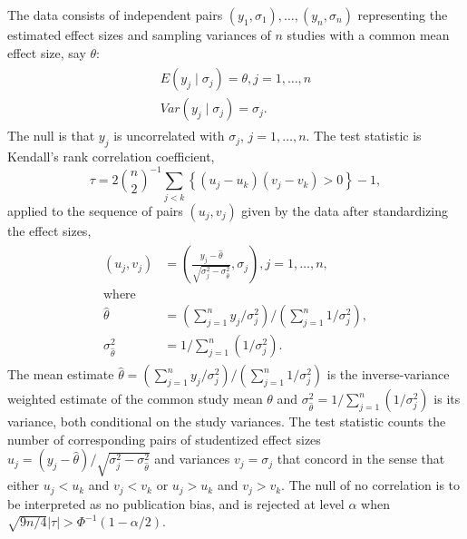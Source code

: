 \documentclass[12pt]{article}
\newcommand{\E}{E}
\newcommand{\V}{Var}
\begin{document}
    The data consists of independent pairs
    $(y_1,\sigma_1),\ldots,(y_n,\sigma_n)$ representing the estimated
    effect sizes and sampling variances of $n$ studies with a common mean effect size, say $\theta$:
    \begin{align}
      \begin{split}
      \E(y_j\mid\sigma_j)=\theta, j=1,\ldots,n\\
      \V(y_j\mid\sigma_j)=\sigma_j.
      \label{model:nonpara}
    \end{split}
    \end{align}
    The null is that $y_j$ is uncorrelated with $\sigma_j$, $j=1,\ldots,n$.
    The test statistic is Kendall's rank
    correlation coefficient,
    $$
    \tau=2{n\choose 2}^{-1}\sum_{j<k}\left\{(u_j-u_k)(v_j-v_k)>0\right\} - 1,
    $$
    applied to the sequence of pairs $(u_j,v_j)$ given by the data after standardizing the effect sizes,
    \begin{align}
      \begin{split}\label{defn:pairs}
        (u_j,v_j)&=\left(\frac{y_j-\hat{\theta}}{\sqrt{\sigma_j^2-\sigma^2_{\hat{\theta}}}},\sigma_j\right),j=1,\ldots,n,\\
        \text{where}\\
        \hat{\theta}&=(\sum_{j=1}^ny_j/\sigma^2_j)/(\sum_{j=1}^n1/\sigma_j^2),\\
        \sigma^2_{\hat{\theta}}&=1/\sum_{j=1}^n(1/\sigma_j^2).
      \end{split}
    \end{align}
    The mean estimate
    $\hat{\theta}=(\sum_{j=1}^ny_j/\sigma^2_j)/(\sum_{j=1}^n1/\sigma_j^2)$
    is the inverse-variance weighted estimate of the common study mean
    $\theta$ and $\sigma^2_{\hat{\theta}}=1/\sum_{j=1}^n(1/\sigma_j^2)$
    is its variance, both conditional on the study variances.  The
    test statistic counts the number of corresponding pairs of
    studentized effect sizes
    $u_j=(y_j-\hat{\theta})/\sqrt{\sigma_j^2-\sigma^2_{\hat{\theta}}}$
    and variances $v_j=\sigma_j$ that concord in
    the sense that either $u_j<u_k$ and $v_j<v_k$ or $u_j>u_k$ and
    $v_j>v_k$. The null of no correlation is to be interpreted as no
    publication bias, and is rejected at level $\alpha$ when
    $\sqrt{9n/4}|\tau| > \Phi^{-1}(1-\alpha/2)$. %
\end{document}
